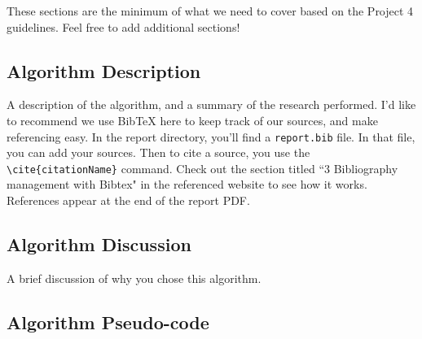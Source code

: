 \documentclass[../report/main.tex]{subfiles}
\begin{document}
These sections are the minimum of what we need to cover based on the Project 4 guidelines. Feel free to add additional sections!

\subsection*{Algorithm Description}

A description of the algorithm, and a summary of the research performed. I'd like to recommend we use BibTeX here to keep track of our sources, and make referencing easy. In the report directory, you'll find a \verb|report.bib| file. In that file, you can add your sources. Then to cite a source, you use the \verb|\cite{citationName}| command. Check out the section titled ``3 Bibliography management with Bibtex" in the referenced website to see how it works. \cite{bibtex} References appear at the end of the report PDF.

\subsection*{Algorithm Discussion}

A brief discussion of why you chose this algorithm.

\subsection*{Algorithm Pseudo-code}
\end{document}
